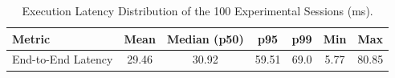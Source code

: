 \begin{table}[!htbp]
\renewcommand{\arraystretch}{1.05}
\centering
\small
\caption{Execution Latency Distribution of the 100 Experimental Sessions (ms).}
\label{tab:session_latency}
\vspace{5pt}
\begin{tabular}{l c c c c c c}
\hline
Metric & Mean & Median (p50) & p95 & p99 & Min & Max \\
\hline
End-to-End Latency & 29.46 & 30.92 & 59.51 & 69.0 & 5.77 & 80.85 \\
\hline
\end{tabular}
\end{table}
